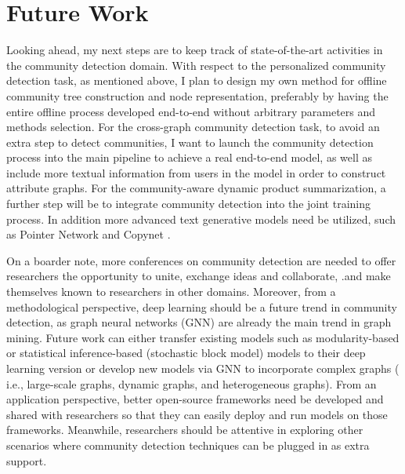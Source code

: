 \section{Future Work}
Looking ahead, my next steps are to keep track of state-of-the-art activities in the community detection domain. With respect to the personalized community detection task, as mentioned above, I plan to design my own method for offline community tree construction and node representation, preferably by having the entire offline process developed end-to-end without arbitrary parameters and methods selection. For the cross-graph community detection task, to avoid an extra step to detect communities, I want to launch the community detection process into the main pipeline to achieve a real end-to-end model, as well as include more textual information from users in the model in order to construct attribute graphs. For the community-aware dynamic product summarization, a further step will be to integrate community detection into the joint training process. In addition more advanced text generative models need be utilized, such as Pointer Network \cite{vinyals2015pointer} and Copynet \cite{gu2016incorporating}.

On a boarder note,  more conferences on community detection are needed to offer researchers the opportunity to unite, exchange ideas and collaborate, .and make themselves known to researchers in other domains. Moreover, from a methodological perspective, deep learning should be a future trend in community detection, as graph neural networks (GNN) are already the main trend in graph mining. Future work can either transfer existing models such as modularity-based or statistical inference-based (stochastic block model) models to their deep learning version or develop new models via GNN to incorporate complex graphs ( i.e., large-scale graphs, dynamic graphs, and heterogeneous graphs). From an application perspective, better open-source frameworks need be developed and shared with researchers so that they can easily deploy and run models on those frameworks. Meanwhile, researchers should be attentive in exploring other scenarios where community detection techniques can be plugged in as extra support. 